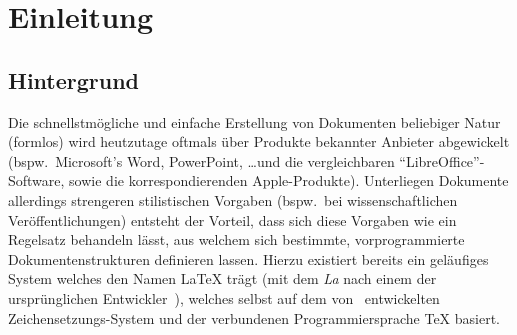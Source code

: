 


\section{Einleitung}
\subsection{Hintergrund}\label{einleitung:hintergrund}
Die schnellstmögliche und einfache Erstellung von Dokumenten beliebiger Natur (formlos) wird heutzutage oftmals über Produkte bekannter Anbieter abgewickelt (bspw.\ Microsoft's Word, PowerPoint, \ldots und die vergleichbaren \enquote{LibreOffice}-Software, sowie die korrespondierenden Apple-Produkte).
Unterliegen Dokumente allerdings strengeren stilistischen Vorgaben (bspw.\ bei wissenschaftlichen Veröffentlichungen) entsteht der Vorteil, dass sich diese Vorgaben wie ein Regelsatz behandeln lässt, aus welchem sich bestimmte, vorprogrammierte Dokumentenstrukturen definieren lassen. Hierzu existiert bereits ein geläufiges System welches den Namen \LaTeX{} trägt (mit dem \textit{La} nach einem der ursprünglichen Entwickler~\cite{latexCompanion:leslieLamport}), welches selbst auf dem von~\cite{texbook} entwickelten Zeichensetzungs-System und der verbundenen Programmiersprache \TeX{} basiert.

